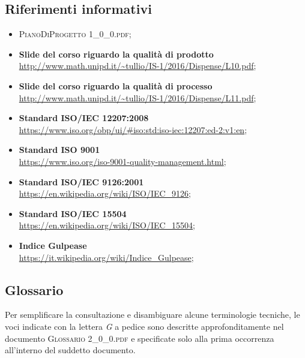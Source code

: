 \subsection{Riferimenti informativi}
\begin{itemize}
	\item \textsc{PianoDiProgetto 1\_0\_0.pdf};
	\item \textbf{Slide del corso riguardo la qualità di prodotto}\\ \url{http://www.math.unipd.it/~tullio/IS-1/2016/Dispense/L10.pdf};
	\item \textbf{Slide del corso riguardo la qualità di processo}\\ \url{http://www.math.unipd.it/~tullio/IS-1/2016/Dispense/L11.pdf};
	\item \textbf{Standard ISO/IEC 12207:2008}\\ \url{https://www.iso.org/obp/ui/#iso:std:iso-iec:12207:ed-2:v1:en};
	\item \textbf{Standard ISO 9001}\\ \url{https://www.iso.org/iso-9001-quality-management.html};
	\item \textbf{Standard ISO/IEC 9126:2001}\\ \url{https://en.wikipedia.org/wiki/ISO/IEC_9126};
	\item \textbf{Standard ISO/IEC 15504}\\ \url{https://en.wikipedia.org/wiki/ISO/IEC_15504};
	\item \textbf{Indice Gulpease}\\ \url{https://it.wikipedia.org/wiki/Indice_Gulpease};
	
\end{itemize}


\subsection{Glossario}
Per semplificare la consultazione e disambiguare alcune terminologie tecniche, le voci indicate con la lettera \textit{G} a pedice sono descritte approfonditamente nel documento \textsc{Glossario 2\_0\_0.pdf} e specificate solo alla prima occorrenza all'interno del suddetto documento.